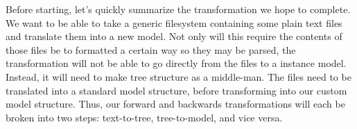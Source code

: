 Before starting, let's quickly summarize the transformation we hope to complete. We want to be able to take a generic filesystem containing some plain text
files and translate them into a new model. Not only will this require the contents of those files be to formatted a certain way so they may be parsed, the
transformation will not be able to go directly from the files to a instance model. Instead, it will need to make tree structure as a middle-man. The files need
to be translated into a standard model structure, before transforming into our custom model structure. Thus, our forward and backwards transformations will each
be broken into two steps: text-to-tree, tree-to-model, and vice versa.
